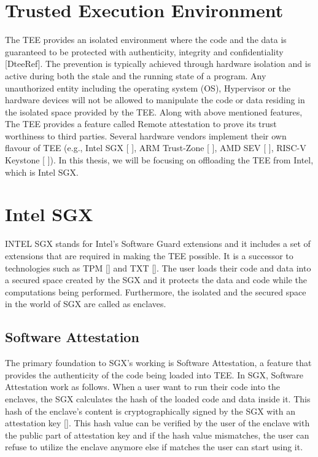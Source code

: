 \documentclass[article, doublespace,nopageskip]{VTthesis} %
\begin{document}
    \section{Trusted Execution Environment} \label{ase:TEE}
    The TEE provides an isolated environment where the code and the data is guaranteed to be protected with authenticity, integrity and confidentiality [DteeRef]. The prevention is typically achieved through hardware isolation and is active during both the stale and the running state of a program. Any unauthorized entity including the operating system (OS), Hypervisor or the hardware devices will not be allowed to manipulate the code or data residing in the isolated space provided by the TEE. Along with above mentioned features, The TEE provides a feature called Remote attestation to prove its trust worthiness to third parties. Several hardware vendors implement their own flavour of TEE (e.g., Intel SGX [ ], ARM Trust-Zone [ ], AMD SEV [ ], RISC-V Keystone [ ]). In this thesis, we will be focusing on offloading the TEE from Intel, which is Intel SGX.

    \section{Intel SGX} \label{ase:Intel SGX}
    INTEL SGX stands for Intel's Software Guard extensions and it includes a set of extensions that are required in making the TEE possible. It is a successor to technologies such as TPM [] and TXT []. The user loads their code and data into a secured space created by the SGX and it protects the data and code while the computations being performed. Furthermore, the isolated and the secured space in the world of SGX are called as enclaves.

    \subsection{Software Attestation} \label{ss: Software Attestation}
    The primary foundation to SGX's working is Software Attestation, a feature that provides the authenticity of the code being loaded into TEE. In SGX, Software Attestation work as follows. When a user want to run their code into the enclaves, the SGX calculates the hash of the loaded code and data inside it. This hash of the enclave's content is cryptographically signed by the SGX with an attestation key []. This hash value can be verified by the user of the enclave with the public part of attestation key and if the hash value mismatches, the user can refuse to utilize the enclave anymore else if matches the user can start using it. 
    
\end{document}
